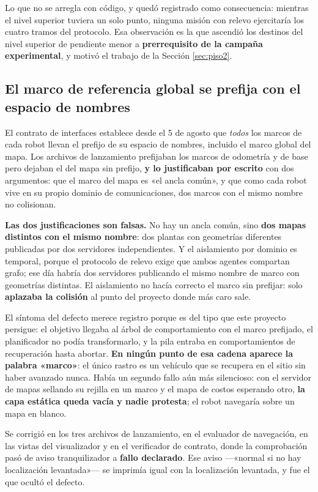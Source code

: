 \documentclass[12pt,letterpaper]{article}
\begin{document}
Lo que no se arregla con código, y quedó registrado como consecuencia: mientras el nivel superior tuviera un solo punto, ninguna misión con relevo ejercitaría los cuatro tramos del protocolo. Esa observación es la que ascendió los destinos del nivel superior de pendiente menor a \textbf{prerrequisito de la campaña experimental}, y motivó el trabajo de la Sección \ref{sec:piso2}.

\subsection{El marco de referencia global se prefija con el espacio de nombres}

El contrato de interfaces establece desde el 5 de agosto que \emph{todos} los marcos de cada robot llevan el prefijo de su espacio de nombres, incluido el marco global del mapa. Los archivos de lanzamiento prefijaban los marcos de odometría y de base pero dejaban el del mapa sin prefijo, \textbf{y lo justificaban por escrito} con dos argumentos: que el marco del mapa es «el ancla común», y que como cada robot vive en su propio dominio de comunicaciones, dos marcos con el mismo nombre no colisionan.

\textbf{Las dos justificaciones son falsas.} No hay un ancla común, sino \textbf{dos mapas distintos con el mismo nombre}: dos plantas con geometrías diferentes publicadas por dos servidores independientes. Y el aislamiento por dominio es temporal, porque el protocolo de relevo exige que ambos agentes compartan grafo; ese día habría dos servidores publicando el mismo nombre de marco con geometrías distintas. El aislamiento no hacía correcto el marco sin prefijar: solo \textbf{aplazaba la colisión} al punto del proyecto donde más caro sale.

El síntoma del defecto merece registro porque es del tipo que este proyecto persigue: el objetivo llegaba al árbol de comportamiento con el marco prefijado, el planificador no podía transformarlo, y la pila entraba en comportamientos de recuperación hasta abortar. \textbf{En ningún punto de esa cadena aparece la palabra «marco»}: el único rastro es un vehículo que se recupera en el sitio sin haber avanzado nunca. Había un segundo fallo aún más silencioso: con el servidor de mapas sellando su rejilla en un marco y el mapa de costos esperando otro, \textbf{la capa estática queda vacía y nadie protesta}; el robot navegaría sobre un mapa en blanco.

Se corrigió en los tres archivos de lanzamiento, en el evaluador de navegación, en las vistas del visualizador y en el verificador de contrato, donde la comprobación pasó de aviso tranquilizador a \textbf{fallo declarado}. Ese aviso ---«normal si no hay localización levantada»--- se imprimía igual con la localización levantada, y fue el que ocultó el defecto.
\end{document}
